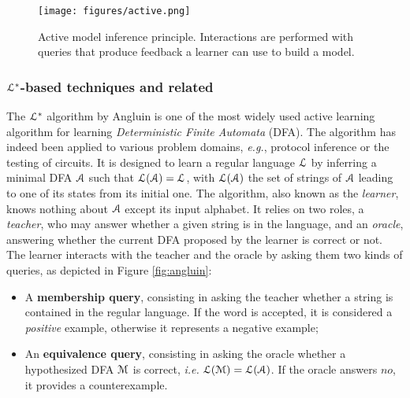 \begin{figure}[h]
    \begin{center}
        \texttt{[image: figures/active.png]}
    \end{center}

    \caption{Active model inference principle. Interactions are
        performed with queries that produce feedback a learner
        can use to build a model.}
    \label{fig:active}
\end{figure}

\subsubsection{$\EuScript{L}^*$-based techniques and related}
\label{sec:active-letoile}

The $\EuScript{L}^*$ algorithm by Angluin \cite{Angluin198787} is
one of the most widely used active learning algorithm for
learning \textit{Deterministic Finite Automata} (DFA). The
algorithm has indeed been applied to various problem domains,
\emph{e.g.}, protocol inference or the testing of circuits. It is
designed to learn a regular language $\EuScript{L}$ by inferring
a minimal DFA $\EuScript{A}$ such that
$\EuScript{L}(\EuScript{A})=\EuScript{L}$, with
$\EuScript{L}(\EuScript{A})$ the set of strings of $\EuScript{A}$
leading to one of its states from its initial one. The algorithm,
also known as the \textit{learner}, knows nothing about
$\EuScript{A}$ except its input alphabet. It relies on two roles,
a \textit{teacher}, who may answer whether a given string is in
the language, and an \textit{oracle}, answering whether the
current DFA proposed by the learner is correct or not. The
learner interacts with the teacher and the oracle by asking them
two kinds of queries, as depicted in Figure \ref{fig:angluin}:

\begin{itemize}
    \item A \textbf{membership query}, consisting in asking the
        teacher whether a string is contained in the regular
        language.  If the word is accepted, it is considered a
        \textit{positive} example, otherwise it represents a
        negative example;

    \item An \textbf{equivalence query}, consisting in asking the
        oracle whether a hypothesized DFA $\EuScript{M}$ is
        correct, \emph{i.e.} $\EuScript{L}(\EuScript{M}) =
        \EuScript{L}(\EuScript{A})$. If the oracle answers $no$,
        it provides a counterexample.
\end{itemize}

